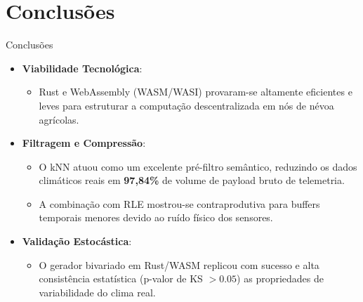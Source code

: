 \documentclass[aspectratio=169]{beamer}
\begin{document}
\section{Conclusões}

\begin{frame}{Conclusões}
  \begin{itemize}
    \item \textbf{Viabilidade Tecnológica}:
      \begin{itemize}
        \item Rust e WebAssembly (WASM/WASI) provaram-se altamente eficientes e leves para estruturar a computação descentralizada em nós de névoa agrícolas.
      \end{itemize}
    \vspace{0.2cm}
    \item \textbf{Filtragem e Compressão}:
      \begin{itemize}
        \item O kNN atuou como um excelente pré-filtro semântico, reduzindo os dados climáticos reais em \textbf{97,84\%} de volume de payload bruto de telemetria.
        \item A combinação com RLE mostrou-se contraprodutiva para buffers temporais menores devido ao ruído físico dos sensores.
      \end{itemize}
    \vspace{0.2cm}
    \item \textbf{Validação Estocástica}:
      \begin{itemize}
        \item O gerador bivariado em Rust/WASM replicou com sucesso e alta consistência estatística (p-valor de KS $> 0.05$) as propriedades de variabilidade do clima real.
      \end{itemize}
  \end{itemize}
\end{frame}
\end{document}
